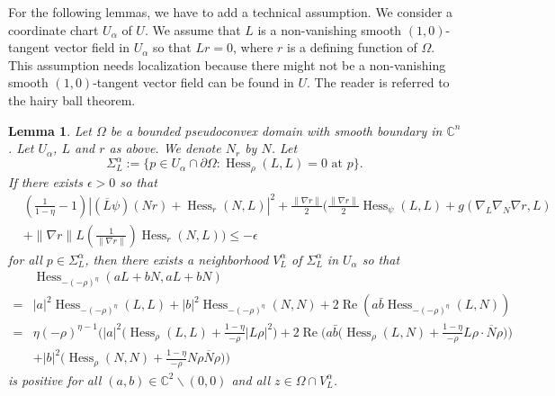 \documentclass[11pt]{article}
\theoremstyle{plain} \numberwithin{equation}{section}
\newtheorem{lemma}[theorem]{Lemma}
\theoremstyle{definition}
\DeclareMathOperator{\Hessian}{Hess}
\renewcommand{\Re}{\operatorname{Re}}
\begin{document}
For the following lemmas, we have to add a technical assumption. We consider a coordinate chart $U_\alpha$ of $U$. We assume that $L$ is a non-vanishing smooth $(1,0)$-tangent vector field in $U_\alpha$ so that $Lr=0$, where $r$ is a defining function of $\Omega$. This assumption needs localization because there might not be a non-vanishing smooth $(1,0)$-tangent vector field can be found in $U$. The reader is referred to the hairy ball theorem.
\begin{lemma}
		Let $\Omega$ be a bounded pseudoconvex domain with smooth boundary in $\mathbb{C}^n$. Let $U_\alpha$, $L$ and $r$ as above. We denote $N_r$ by $N$. Let \[\Sigma^\alpha_L:=\lbrace p\in U_\alpha\cap\partial\Omega: \Hessian_\rho(L, L)=0 \text{  at  } p\rbrace.\]  If there exists $\epsilon>0$ so that \[\begin{split}
		&\left(\frac{1}{1-\eta}-1\right)\left|(\overline{L}\psi)(Nr)+\Hessian_r(N, L)\right|^2+\frac{\|\nabla r\|}{2}\Bigg(\frac{\|\nabla r\|}{2}\Hessian_\psi(L, L)+g(\nabla_L\nabla_N\nabla r, L)\\&+\|\nabla r\|L\left(\frac{1}{\|\nabla r\|}\right)\Hessian_r(N, L)\Bigg)\leq -\epsilon	 \end{split}
		\]  for all $p\in\Sigma^\alpha_L$, then there exists a neighborhood $V^\alpha_L$ of $\Sigma^\alpha_L$ in $U_\alpha$ so that \[\begin{split}
	&\Hessian_{-(-\rho)^\eta }(aL+bN,aL+bN)\\=&|a|^2\Hessian_{-(-\rho)^\eta}(L, L)+|b|^2\Hessian_{-(-\rho)^\eta }(N, N)+2\Re (a\bar{b}\Hessian_{-(-\rho)^\eta }(L, N))\\=&\eta (-\rho)^{\eta-1}\Bigg(|a|^2\Big(\Hessian_\rho (L, L)+\frac{1-\eta}{-\rho}|L\rho|^2\Big)+2\Re \Big(a\bar{b}\Big(\Hessian_\rho (L, N)+\frac{1-\eta}{-\rho}L\rho\cdot\overline{N}\rho\Big)\Big)\\&+|b|^2 \Big(\Hessian_\rho (N, N)+\frac{1-\eta}{-\rho}N\rho\overline{N} \rho\Big)\Bigg)
	\end{split}\] is positive for all $(a,b)\in\mathbb{C}^2\backslash(0,0)$ and all $z\in\Omega\cap V^\alpha_L$.
\end{lemma}
\end{document}
